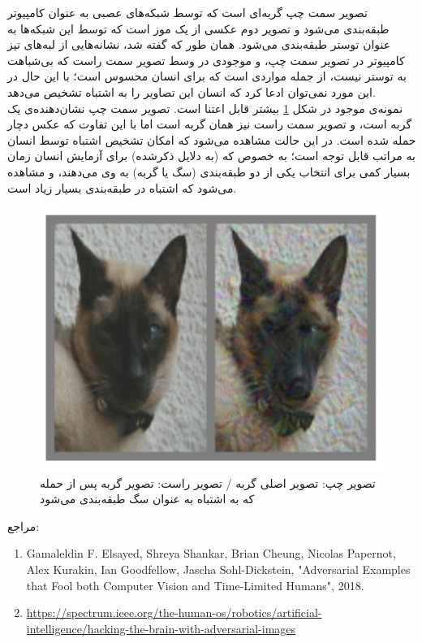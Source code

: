\documentclass[a4paper]{article}
\begin{document}
\begin{itemize}
تصویر سمت چپ گربه‌ای است که توسط شبکه‌های عصبی به عنوان کامپیوتر طبقه‌بندی می‌شود و تصویر دوم عکسی از یک موز است که توسط این شبکه‌ها به عنوان توستر طبقه‌بندی می‌شود. همان طور که گفته شد، نشانه‌هایی از لبه‌های تیز کامپیوتر در تصویر سمت چپ، و موجودی در وسط تصویر سمت راست که بی‌شباهت به توستر نیست، از جمله مواردی است که برای انسان محسوس است؛ با این حال در این مورد نمی‌توان ادعا کرد که انسان این تصاویر را به اشتباه تشخیص می‌دهد.\\

نمونه‌ی موجود در شکل \ref{fig02} بیشتر قابل اعتنا است. تصویر سمت چپ نشان‌دهنده‌ی یک گربه است، و تصویر سمت راست نیز همان گربه است اما با این تفاوت که عکس دچار حمله  شده است. در این حالت مشاهده می‌شود که امکان تشخیص اشتباه توسط انسان به مراتب قابل توجه است؛ به خصوص که (به دلایل ذکرشده) برای آزمایش انسان زمان بسیار کمی برای انتخاب یکی از دو طبقه‌بندی (سگ یا گربه) به وی می‌دهند، و مشاهده می‌شود که اشتباه در طبقه‌بندی بسیار زیاد است.

\begin{figure}[h!]
	\centering
	\includegraphics[scale=0.5]{fig02.png}
	\caption{تصویر چپ: تصویر اصلی گربه / تصویر راست: تصویر گربه پس از حمله  که به اشتباه به عنوان سگ طبقه‌بندی می‌شود}
	\label{fig02}
\end{figure}	
			مراجع:\\

\begin{latin}
	\begin{enumerate}
		\item 
		Gamaleldin F. Elsayed, 
		Shreya Shankar, 
		Brian Cheung, 
		Nicolas Papernot, 
		Alex Kurakin, 
		Ian Goodfellow, 
		Jascha Sohl-Dickstein, "Adversarial Examples that Fool both Computer
		Vision and Time-Limited Humans", 2018.
		
		\item 
\url{		https://spectrum.ieee.org/the-human-os/robotics/artificial-intelligence/hacking-the-brain-with-adversarial-images}
	\end{enumerate}
\end{latin}


	
	\end{itemize}
	
\end{document}
